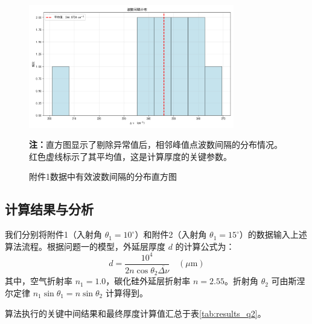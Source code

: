 \documentclass[withoutpreface,bwprint]{cumcmthesis} %
\begin{document}
\begin{figure}[htbp]
    \centering
    \includegraphics[width=0.8\textwidth]{figures/delta_nu_distribution_10deg.png}
    \caption{附件1数据中有效波数间隔的分布直方图}
    \label{fig:delta_nu_dist}
    \textbf{注：}直方图显示了剔除异常值后，相邻峰值点波数间隔的分布情况。红色虚线标示了其平均值，这是计算厚度的关键参数。
\end{figure}

\subsection{计算结果与分析}
我们分别将附件1（入射角 $\theta_1 = 10^\circ$）和附件2（入射角 $\theta_1 = 15^\circ$）的数据输入上述算法流程。根据问题一的模型，外延层厚度 $d$ 的计算公式为：
\begin{equation}
    d = \frac{10^4}{2 n \cos\theta_2 \overline{\Delta\nu}} \quad (\mu\text{m})
\end{equation}
其中，空气折射率 $n_1=1.0$，碳化硅外延层折射率 $n=2.55$。折射角 $\theta_2$ 可由斯涅尔定律 $n_1 \sin\theta_1 = n \sin\theta_2$ 计算得到。

算法执行的关键中间结果和最终厚度计算值汇总于表\ref{tab:results_q2}。
\end{document}
